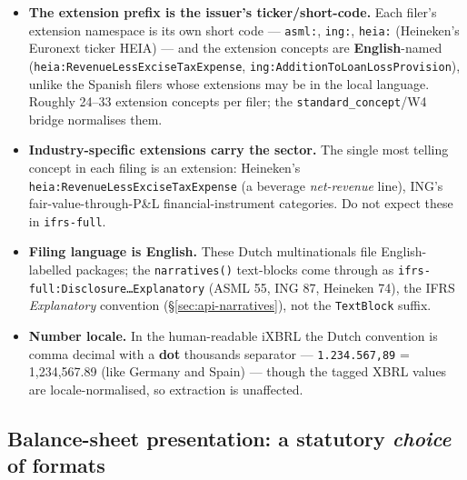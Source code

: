 \documentclass[11pt,a4paper]{report}
\begin{document}
\begin{itemize}
  \item \textbf{The extension prefix is the issuer's ticker/short-code.} Each filer's extension namespace is
    its own short code --- \texttt{asml:}, \texttt{ing:}, \texttt{heia:} (Heineken's Euronext ticker HEIA) ---
    and the extension concepts are \textbf{English}-named (\texttt{heia:RevenueLessExciseTaxExpense},
    \texttt{ing:AdditionToLoanLossProvision}), unlike the Spanish filers whose extensions may be in the local
    language. Roughly 24--33 extension concepts per filer; the \texttt{standard\_concept}/W4 bridge normalises
    them.
  \item \textbf{Industry-specific extensions carry the sector.} The single most telling concept in each filing
    is an extension: Heineken's \texttt{heia:RevenueLessExciseTaxExpense} (a beverage \emph{net-revenue} line),
    ING's fair-value-through-P\&L financial-instrument categories. Do not expect these in \texttt{ifrs-full}.
  \item \textbf{Filing language is English.} These Dutch multinationals file English-labelled packages; the
    \texttt{narratives()} text-blocks come through as \texttt{ifrs-full:Disclosure\ldots Explanatory} (ASML 55,
    ING 87, Heineken 74), the IFRS \emph{Explanatory} convention (\S\ref{sec:api-narratives}), not the
    \texttt{TextBlock} suffix.
  \item \textbf{Number locale.} In the human-readable iXBRL the Dutch convention is comma decimal with a
    \textbf{dot} thousands separator --- \texttt{1.234.567,89} = 1{,}234{,}567.89 (like Germany and Spain) ---
    though the tagged XBRL values are locale-normalised, so extraction is unaffected.
\end{itemize}

\subsection{Balance-sheet presentation: a statutory \emph{choice} of formats}
\label{sec:esef-nl-tshape}
\end{document}
